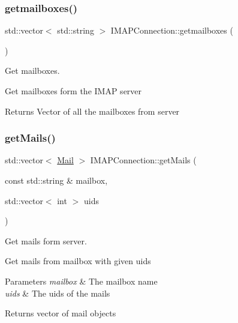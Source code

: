 \subsubsection{\texorpdfstring{getmailboxes()}{getmailboxes()}}
{\footnotesize\ttfamily std\+::vector$<$ std\+::string $>$ I\+M\+A\+P\+Connection\+::getmailboxes (\begin{DoxyParamCaption}{ }\end{DoxyParamCaption})}



Get mailboxes. 

Get mailboxes form the I\+M\+AP server \begin{DoxyReturn}{Returns}
Vector of all the mailboxes from server 
\end{DoxyReturn}
\mbox{\label{classIMAPConnection_a91f2832ee1eb91fc441e37d473185a31}} 
\subsubsection{\texorpdfstring{get\+Mails()}{getMails()}}
{\footnotesize\ttfamily std\+::vector$<$ \hyperlink{structMail}{Mail} $>$ I\+M\+A\+P\+Connection\+::get\+Mails (\begin{DoxyParamCaption}\item[{const std\+::string \&}]{mailbox,  }\item[{std\+::vector$<$ int $>$}]{uids }\end{DoxyParamCaption})}



Get mails form server. 

Get mails from mailbox with given uids


\begin{DoxyParams}{Parameters}
{\em mailbox} & The mailbox name \\
\hline
{\em uids} & The uids of the mails\\
\hline
\end{DoxyParams}
\begin{DoxyReturn}{Returns}
vector of mail objects 
\end{DoxyReturn}
\mbox{\label{classIMAPConnection_a0ddf65870bb9a995a3bd48a78d80265a}} 
